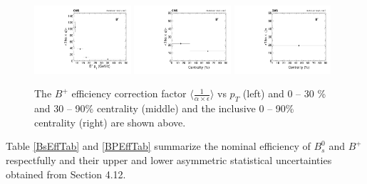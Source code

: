 \begin{figure}[h]
\begin{center}
\includegraphics[width= 0.32\textwidth]{Figures/Chapter5/BPEffPlotPt.pdf}
\includegraphics[width= 0.32\textwidth]{Figures/Chapter5/BPEffPlotCent.pdf}
\includegraphics[width= 0.32\textwidth]{Figures/Chapter5/BPEffPlotCentInc.pdf}
\caption{The  $B^+$ efficiency correction factor $\langle \frac{1}{\alpha \times \epsilon} \rangle$ vs $p_T$ (left) and 0 -- 30 \% and 30 -- 90\% centrality (middle) and the inclusive 0 -- 90\% centrality (right) are shown above.}
\label{BPEffFig}
\end{center}
\end{figure}




Table \ref{BsEffTab} and \ref{BPEffTab} summarize the nominal efficiency of $B^0_s$ and $B^+$ respectfully and their upper and lower asymmetric statistical uncertainties obtained from Section 4.12.


